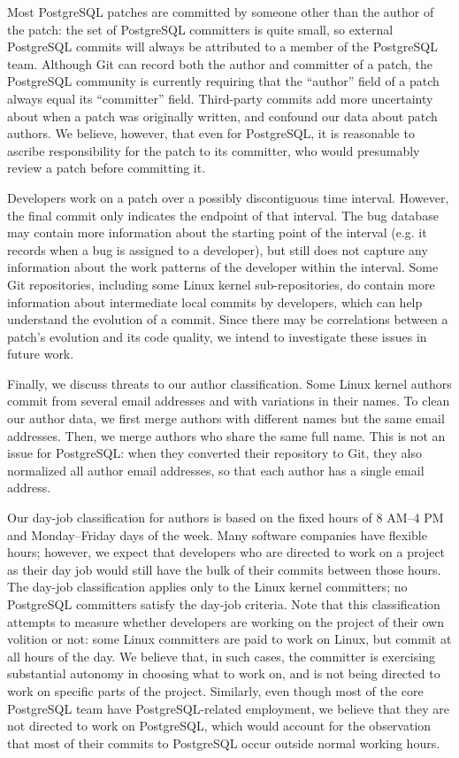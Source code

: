 Most PostgreSQL patches are committed by someone other than the author of the
patch: the set of PostgreSQL committers is quite small, so external PostgreSQL
commits will always be attributed to a member of the PostgreSQL team. Although
Git can record both the author and committer of a patch, the PostgreSQL
community is currently requiring that the ``author'' field of a patch always
equal its ``committer'' field.  Third-party commits add more uncertainty about
when a patch was originally written, and confound our data about patch authors.
We believe, however, that even for PostgreSQL, it is reasonable to ascribe
responsibility for the patch to its committer, who would presumably review a
patch before committing it.

Developers work on a patch over a possibly discontiguous time interval. However,
the final commit only indicates the endpoint of that interval.  The bug database
may contain more information about the starting point of the interval (e.g. it
records when a bug is assigned to a developer), but still does not capture any
information about the work patterns of the developer within the interval. Some
Git repositories, including some Linux kernel sub-repositories, do contain more
information about intermediate local commits by developers, which can help
understand the evolution of a commit. Since there may be correlations between a
patch's evolution and its code quality, we intend to investigate these issues in
future work.

Finally, we discuss threats to our author classification. Some Linux
kernel authors commit from several email addresses and with variations
in their names.  To clean our author data, we first merge authors with
different names but the same email addresses.  Then, we merge authors
who share the same full name. This is not an issue for PostgreSQL:
when they converted their repository to Git, they also normalized all
author email addresses, so that each author has a single email
address.

Our day-job classification for authors is based on the fixed hours of
8 AM--4 PM and Monday--Friday days of the week. Many software companies
have flexible hours; however, we expect that developers who are
directed to work on a project as their day job would still have the
bulk of their commits between those hours. The day-job classification
applies only to the Linux kernel committers; no PostgreSQL committers
satisfy the day-job criteria. Note that this classification attempts
to measure whether developers are working on the project of their own
volition or not: some Linux committers 
are paid to work on Linux, but commit at all hours of the day. 
We believe that, in
such cases, the committer is exercising substantial autonomy in
choosing what to work on, and is not being directed to work on
specific parts of the project.  Similarly, even though most of the
core PostgreSQL team have PostgreSQL-related employment, we believe
that they are not directed to work on PostgreSQL, which would account
for the observation that most of their commits to PostgreSQL occur
outside normal working hours.

